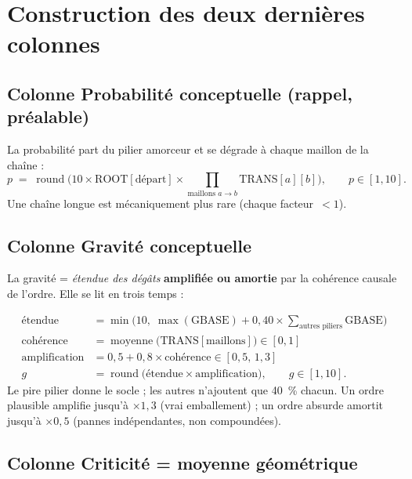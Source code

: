 \documentclass[11pt,a4paper]{article}
\newcommand{\fl}{\ensuremath{\!\rightarrow\!}}
\begin{document}
\section{Construction des deux dernières colonnes}

\subsection*{Colonne \og{}Probabilité conceptuelle\fg{} (rappel, préalable)}

La probabilité part du pilier amorceur et se dégrade à chaque maillon de la chaîne :
\begin{equation}
p \;=\; \operatorname{round}\!\Big(10 \times \text{ROOT}[\text{départ}]
      \times \!\!\prod_{\text{maillons } a\fl b}\!\! \text{TRANS}[a][b]\Big),
\qquad p \in [1,10].
\end{equation}
Une chaîne longue est mécaniquement plus rare (chaque facteur~$<1$).

\subsection*{Colonne \og{}Gravité conceptuelle\fg{}}

La gravité = \emph{étendue des dégâts} \textbf{amplifiée ou amortie} par la cohérence
causale de l'ordre. Elle se lit en trois temps :

\begin{align}
\text{étendue} &= \min\!\Big(10,\; \max(\text{GBASE}) + 0{,}40\times\!\!\sum_{\text{autres piliers}}\!\!\text{GBASE}\Big) \\[2pt]
\text{cohérence} &= \operatorname{moyenne}\big(\text{TRANS}[\text{maillons}]\big) \in [0,1] \\[2pt]
\text{amplification} &= 0{,}5 + 0{,}8\times\text{cohérence} \in [0{,}5,\,1{,}3] \\[2pt]
g &= \operatorname{round}\big(\text{étendue}\times\text{amplification}\big), \qquad g\in[1,10].
\end{align}
Le pire pilier donne le socle ; les autres n'ajoutent que 40~\% chacun. Un ordre plausible
amplifie jusqu'à $\times1{,}3$ (vrai emballement) ; un ordre absurde amortit jusqu'à
$\times0{,}5$ (pannes indépendantes, non compoundées).

\subsection*{Colonne \og{}Criticité\fg{} = moyenne géométrique}
\end{document}
